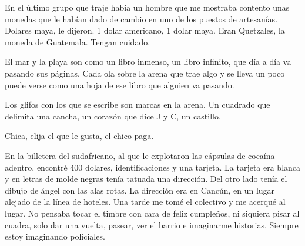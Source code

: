\documentclass[11pt,twoside,openright,a6paper]{book}
\begin{document}
\vspace{0.5cm}
\hrulefill\hspace{0.2cm} \decofourleft\decofourright \hspace{0.2cm} \hrulefill
\vspace{0.5cm}

En el último grupo que traje había un hombre que me mostraba contento
unas monedas que le habían dado de cambio en uno de los puestos de
artesanías. Dolares maya, le dijeron. 1 dolar americano, 1 dolar maya. Eran
Quetzales, la moneda de Guatemala. Tengan cuidado.


\vspace{0.5cm}
\hrulefill\hspace{0.2cm} \decofourleft\decofourright \hspace{0.2cm} \hrulefill
\vspace{0.5cm}

El mar y la playa son como un libro inmenso, un libro infinito, que día
a día va pasando sus páginas. Cada ola sobre la arena que trae algo y se
lleva un poco puede verse como una hoja de ese libro que alguien va pasando.

Los glifos con los que se escribe son marcas en la arena. Un cuadrado que
delimita una cancha, un corazón que dice J y C, un castillo.


\vspace{0.5cm}
\hrulefill\hspace{0.2cm} \decofourleft\decofourright \hspace{0.2cm} \hrulefill
\vspace{0.5cm}

Chica, elija el que le gusta, el chico paga.


\vspace{0.5cm}
\hrulefill\hspace{0.2cm} \decofourleft\decofourright \hspace{0.2cm} \hrulefill
\vspace{0.5cm}

En la billetera del sudafricano, al que le explotaron las cápsulas
de cocaína adentro, encontré 400 dolares, identificaciones y una
tarjeta. La tarjeta era blanca y en letras de molde negras tenía tatuada
una dirección. Del otro lado tenía el dibujo de ángel con las alas
rotas. La dirección era en Cancún, en un lugar alejado de la línea de
hoteles. Una tarde me tomé el colectivo y me acerqué al lugar. No pensaba
tocar el timbre con cara de feliz cumpleños, ni siquiera pisar al cuadra,
solo dar una vuelta, pasear, ver el barrio e imaginarme historias. Siempre
estoy imaginando policiales.
\end{document}
